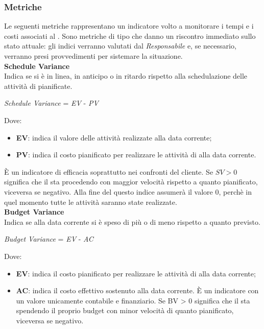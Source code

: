 \subsubsection{Metriche}\label{MetricheProc}
\hypertarget{metriche_processi}{}
Le seguenti metriche rappresentano un indicatore volto a monitorare i tempi e i costi associati al . Sono metriche di tipo  che danno un riscontro immediato sullo stato attuale: gli indici verranno valutati dal \textit{Responsabile} e, se necessario, verranno presi provvedimenti per sistemare la situazione.\\

\textbf{Schedule Variance}\\

Indica se si è in linea, in anticipo o in ritardo rispetto alla schedulazione delle attività di 
pianificate.
\begin{center}
	\textit{Schedule Variance} = \textit{EV} - \textit{PV} 
\end{center}
Dove:
\begin{itemize}
	\item \textbf{EV}: indica il valore delle attivit\`a realizzate alla data corrente;
	\item \textbf{PV}: indica il costo pianificato per realizzare le attività di  alla data corrente.
\end{itemize}
\`E un indicatore di efficacia soprattutto nei confronti del cliente. Se \begin{math}{SV > 0}\end{math} significa che il  sta procedendo con maggior velocit\`a rispetto a quanto pianificato, viceversa se negativo. Alla fine del  questo indice assumer\`a il valore 0, perch\`e in quel momento tutte le attivit\`a saranno state realizzate.\\

\textbf{Budget Variance}\\

Indica se alla data corrente si \`e speso di pi\`u o di meno rispetto a quanto previsto.\\
\begin{center}
	\textit{Budget Variance} = \textit{EV} - \textit{AC}
\end{center}
Dove:
\begin{itemize}
	\item \textbf{EV}: indica il costo pianificato per realizzare le attività di  alla data corrente;
	\item \textbf{AC}: indica il costo effettivo sostenuto alla data corrente. \`E un indicatore con
un valore unicamente contabile e finanziario. Se BV > 0 significa che il  sta spendendo
il proprio budget con minor velocità di quanto pianificato, viceversa se negativo.
\end{itemize}

